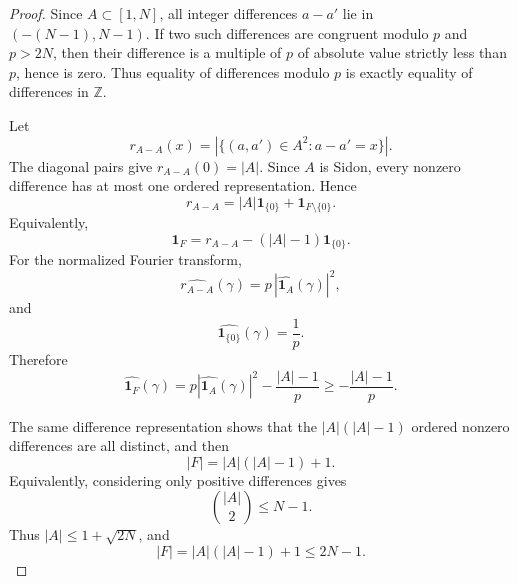 \documentclass[11pt]{article}
\numberwithin{equation}{section}
\newcommand{\Z}{\mathbb Z}
\newcommand{\1}{\mathbf 1}
\begin{document}
\begin{proof}
Since \(A\subset[1,N]\), all integer differences \(a-a'\) lie in
\((-(N-1),N-1)\).  If two such differences are congruent modulo \(p\) and
\(p>2N\), then their difference is a multiple of \(p\) of absolute value
strictly less than \(p\), hence is zero.  Thus equality of differences
modulo \(p\) is exactly equality of differences in \(\Z\).

Let
\[
        r_{A-A}(x)=|\{(a,a')\in A^2:a-a'=x\}|.
\]
The diagonal pairs give \(r_{A-A}(0)=|A|\).  Since \(A\) is Sidon, every
nonzero difference has at most one ordered representation.  Hence
\[
        r_{A-A}=|A|\1_{\{0\}}+\1_{F\setminus\{0\}}.
\]
Equivalently,
\[
        \1_F=r_{A-A}-(|A|-1)\1_{\{0\}}.
\]
For the normalized Fourier transform,
\[
        \widehat{r_{A-A}}(\gamma)
        =
        p\,|\widehat{\1_A}(\gamma)|^2,
\]
and
\[
        \widehat{\1_{\{0\}}}(\gamma)=\frac1p.
\]
Therefore
\[
        \widehat{\1_F}(\gamma)
        =
        p|\widehat{\1_A}(\gamma)|^2-\frac{|A|-1}{p}
        \ge
        -\frac{|A|-1}{p}.
\]

The same difference representation shows that the \(|A|(|A|-1)\) ordered
nonzero differences are all distinct, and then
\[
        |F|=|A|(|A|-1)+1.
\]
Equivalently, considering only positive differences gives
\[
        \binom{|A|}{2}\le N-1.
\]
Thus \(|A|\le 1+\sqrt{2N}\), and
\[
        |F|=|A|(|A|-1)+1\le 2N-1.
\]
\end{proof}
\end{document}
